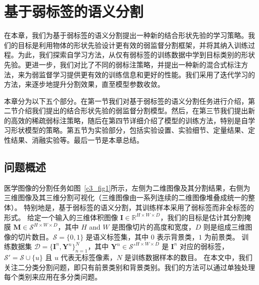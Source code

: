 \chapter{基于弱标签的语义分割}

在本章，我们为基于弱标签的语义分割提出一种新的结合形状先验的学习策略。我们的目标是利用物体的形状先验设计更有效的弱监督分割框架，并将其纳入训练过程。为此，我们探索自学习方法，从仅有弱标签的训练数据中学到目标类别的形状先验。更进一步，我们对比了不同的弱标注策略，并提出一种新的混合式标注方法，来为弱监督学习提供更有效的训练信息和更好的性能。我们采用了迭代学习的方法，来逐步地提升分割效果，直至模型参数收敛。

本章分为以下五个部分。在第一节我们对基于弱标签的语义分割任务进行介绍，第二节介绍我们提出的结合形状先验的弱监督分割模型。然后，在第三节我们提出新的高效的稀疏弱标注策略，随后在第四节详细介绍了模型的训练方法，特别是自学习形状模型的策略。第五节为实验部分，包括实验设置、实验细节、定量结果、定性结果、消融实验等。最后一节是本章总结。

\section{问题概述}
医学图像的分割任务如图~\ref{c3_fig1}所示，左侧为二维图像及其分割结果，右侧为三维图像及其三维分割可视化（三维图像由一系列连续的二维图像堆叠成统一的整体）。
特别地是，基于弱标签的语义分割，其训练样本采用了弱标签而非全标签的形式。
给定一个输入的三维体积图像 $\mathbf{I} \in \mathbb{R}^{H \times W \times D}$，我们的目标是估计其分割掩膜 $\mathbf{M} \in \mathcal{S}^{H \times W \times D}$，其中 $H$ and $W$ 是图像切片的高度和宽度，$D$ 则是组成三维图像的切片数目。$\mathcal{S} = \{0, 1\}$ 是语义标签集，其中 $0$ 表示背景类，$1$ 为前景类。
训练数据集 $\mathcal{D} = \{\mathbf{I}^n, \mathbf{Y}^n\}_{n=1}^N$，其中 $\mathbf{Y}^n \in \mathcal{S}'^{H \times W \times D}$ 是 $\mathbf{I}^n$ 对应的弱标签， $\mathcal{S}' = \mathcal{S} \cup \{u\}$ 且 $u$ 代表无标签像素，$N$ 是训练数据样本的数目。
在本文中，我们关注二分类分割问题，即只有前景类别和背景类别。我们的方法可以通过单独处理每个类别来应用在多分类问题。

